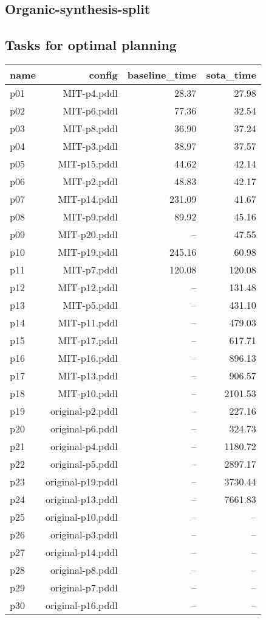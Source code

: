 \documentclass{article}
\begin{document}
                \newpage \subsection{Organic-synthesis-split}
                    \subsection*{Tasks for optimal planning}
                    
                            \begin{center}
                            \scriptsize
                            \begin{tabular}{@{}l|r|r|r@{}}
                            name & config & baseline\_time & sota\_time\\\midrule
                              p01& MIT-p4.pddl&28.37&27.98\\
  p02& MIT-p6.pddl&77.36&32.54\\
  p03& MIT-p8.pddl&36.90&37.24\\
  p04& MIT-p3.pddl&38.97&37.57\\
  p05& MIT-p15.pddl&44.62&42.14\\
  p06& MIT-p2.pddl&48.83&42.17\\
  p07& MIT-p14.pddl&231.09&41.67\\
  p08& MIT-p9.pddl&89.92&45.16\\
  p09& MIT-p20.pddl&--&47.55\\
  p10& MIT-p19.pddl&245.16&60.98\\
  p11& MIT-p7.pddl&120.08&120.08\\
  p12& MIT-p12.pddl&--&131.48\\
  p13& MIT-p5.pddl&--&431.10\\
  p14& MIT-p11.pddl&--&479.03\\
  p15& MIT-p17.pddl&--&617.71\\
  p16& MIT-p16.pddl&--&896.13\\
  p17& MIT-p13.pddl&--&906.57\\
  p18& MIT-p10.pddl&--&2101.53\\
  p19& original-p2.pddl&--&227.16\\
  p20& original-p6.pddl&--&324.73\\
  p21& original-p4.pddl&--&1180.72\\
  p22& original-p5.pddl&--&2897.17\\
  p23& original-p19.pddl&--&3730.44\\
  p24& original-p13.pddl&--&7661.83\\
  p25& original-p10.pddl&--&--\\
  p26& original-p3.pddl&--&--\\
  p27& original-p14.pddl&--&--\\
  p28& original-p8.pddl&--&--\\
  p29& original-p7.pddl&--&--\\
  p30& original-p16.pddl&--&--
                            \end{tabular}
                            \end{center}
                    
\end{document}
